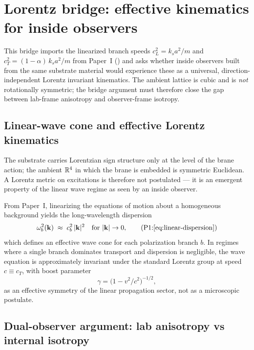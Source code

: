 \section{Lorentz bridge: effective kinematics for inside observers}
\label{sec:lorentz}

This bridge imports the linearized branch speeds $c_L^2 = k_s a^2/m$ and
$c_T^2 = (1-\alpha)\,k_s a^2/m$ from Paper~I ()
and asks whether inside observers built from the same substrate material would
experience these as a universal, direction-independent Lorentz invariant kinematics.
The ambient lattice is cubic and is \emph{not} rotationally symmetric; the bridge
argument must therefore close the gap between lab-frame anisotropy and
observer-frame isotropy.

\subsection{Linear-wave cone and effective Lorentz kinematics}

The substrate carries Lorentzian sign structure only at the level of the brane action;
the ambient $\mathbb{R}^4$ in which the brane is embedded is symmetric Euclidean.
A Lorentz metric on excitations is therefore not postulated --- it is an emergent property
of the linear wave regime as seen by an inside observer.

From Paper~I, linearizing the equations of motion about a homogeneous background yields the
long-wavelength dispersion
\begin{equation}
  \omega_b^2(\veck)\;\approx\; c_b^2\,|\veck|^2 \quad \text{for } |\veck|\to 0,
  \tag{P1:\ref{eq:linear-dispersion}}
\end{equation}
which defines an effective wave cone for each polarization branch $b$.
In regimes where a single branch dominates transport and dispersion is negligible, the wave
equation is approximately invariant under the standard Lorentz group at speed $c \equiv c_T$,
with boost parameter
\begin{equation}
  \gamma = \bigl(1-v^2/c^2\bigr)^{-1/2},
  \label{eq:lorentz-boost}
\end{equation}
as an effective symmetry of the linear propagation sector, not as a microscopic postulate.

\subsection{Dual-observer argument: lab anisotropy vs internal isotropy}
\label{para:dual-observer}

